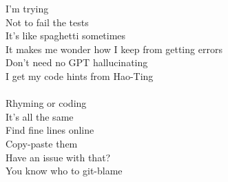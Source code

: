 \documentclass{article}
\begin{document}
{{I’m trying \\
Not to fail the tests \\
It’s like spaghetti sometimes \\
It makes me wonder how I keep from getting errors \\
Don’t need no GPT hallucinating \\
I get my code hints from Hao-Ting \\
\\
Rhyming or coding \\
It’s all the same \\
Find fine lines online \\
Copy-paste them \\
Have an issue with that? \\
You know who to git-blame \\
}}
\end{document}

